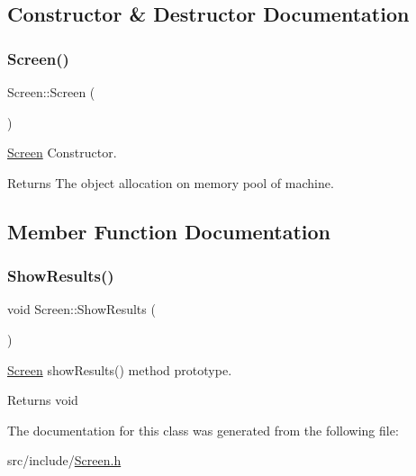 \subsection{Constructor \& Destructor Documentation}
\mbox{\label{classScreen_ae7576476fc6e6a6eaa66389fdc41fe72}} 
\subsubsection{\texorpdfstring{Screen()}{Screen()}}
{\footnotesize\ttfamily Screen\+::\+Screen (\begin{DoxyParamCaption}{ }\end{DoxyParamCaption})}



\hyperlink{classScreen}{Screen} Constructor. 

\begin{DoxyReturn}{Returns}
The object allocation on memory pool of machine. 
\end{DoxyReturn}


\subsection{Member Function Documentation}
\mbox{\label{classScreen_a730e65a899182a4de7ac55b2794fa2ae}} 
\subsubsection{\texorpdfstring{Show\+Results()}{ShowResults()}}
{\footnotesize\ttfamily void Screen\+::\+Show\+Results (\begin{DoxyParamCaption}{ }\end{DoxyParamCaption})}



\hyperlink{classScreen}{Screen} show\+Results() method prototype. 

\begin{DoxyReturn}{Returns}
void 
\end{DoxyReturn}


The documentation for this class was generated from the following file\+:\begin{DoxyCompactItemize}
\item 
src/include/\hyperlink{Screen_8h}{Screen.\+h}\end{DoxyCompactItemize}
